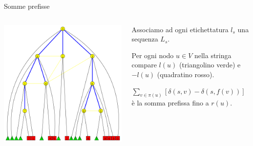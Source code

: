 \documentclass{beamer}
\theoremstyle{plain}
\theoremstyle{definition}
\theoremstyle{remark}
\newcommand{\pa}[1]{\left(#1\right)}
\newcommand{\bra}[1]{\left[#1\right]}
\begin{document}
\begin{frame}{Somme prefisse}
  \begin{columns}
    \begin{column}{0.6\textwidth}
      \includegraphics[width=\textwidth]{labeltree}
    \end{column}
    \begin{column}{0.4\textwidth}
      Associamo ad ogni etichettatura $l_s$ una sequenza $L_s$.

      Per ogni nodo $u\in V$ nella stringa compare $l(u)$ (triangolino
      verde) e $-l(u)$ (quadratino rosso).  \vfill \pause
      
      $\sum _{v\in \pi(u)} \bra{ \delta\pa{ s,v} - \delta\pa{ s,f(v) } }$
      \`e la somma prefissa fino a $r(u)$.
    \end{column}
  \end{columns}
\end{frame}
\end{document}
